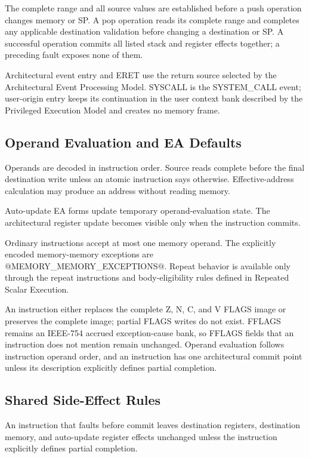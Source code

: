 The complete range and all source values are established before a push operation changes memory or SP. A pop
operation reads its complete range and completes any applicable destination validation before changing a destination
or SP. A successful operation commits all listed stack and register effects together; a preceding fault exposes none
of them.

Architectural event entry and ERET use the return source selected by the Architectural Event Processing Model.
SYSCALL is the SYSTEM\_CALL event; user-origin entry keeps its continuation in the user context bank described by
the Privileged Execution Model and creates no memory frame.

\subsection{Operand Evaluation and EA Defaults}
Operands are decoded in instruction order. Source reads complete before the final destination write unless an
atomic instruction says otherwise. Effective-address calculation may produce an address without reading memory.

Auto-update EA forms update temporary operand-evaluation state. The architectural register update becomes
visible only when the instruction commits.

Ordinary instructions accept at most one memory operand. The explicitly encoded memory-memory exceptions are
@MEMORY_MEMORY_EXCEPTIONS@. Repeat behavior is available only through the repeat instructions and body-eligibility
rules defined in Repeated Scalar Execution.

An instruction either replaces the complete Z, N, C, and V FLAGS image or preserves the complete image; partial FLAGS
writes do not exist. FFLAGS remains an IEEE-754 accrued exception-cause bank, so FFLAGS fields that an instruction does
not mention remain unchanged. Operand evaluation follows
instruction operand order, and an instruction has one architectural commit point unless its description explicitly
defines partial completion.

\subsection{Shared Side-Effect Rules}
An instruction that faults before commit leaves destination registers, destination memory, and auto-update
register effects unchanged unless the instruction explicitly defines partial completion.

